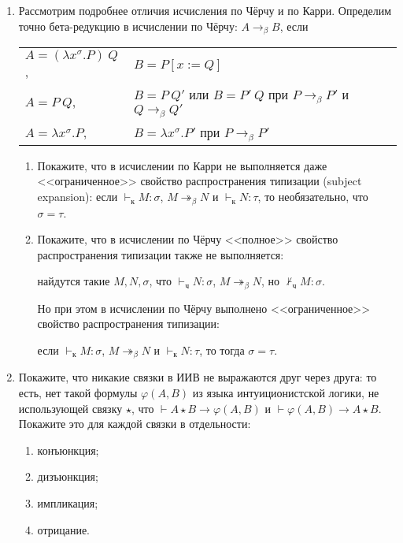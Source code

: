 \documentclass[10pt,a4paper,oneside]{article}
\begin{document}
\begin{enumerate}
\item Рассмотрим подробнее отличия исчисления по Чёрчу и по Карри. 
Определим точно бета-редукцию в исчислении по Чёрчу: $A \rightarrow_\beta B$, если

\begin{tabular}{ll}
$A = (\lambda x^\sigma.P)\ Q$, & $B = P [x := Q]$\\
$A = P\ Q$, & $B = P\ Q'$ или $B = P'\ Q$ при $P \rightarrow_\beta P'$ и $Q \rightarrow_\beta Q'$\\
$A = \lambda x^\sigma.P$, & $B = \lambda x^\sigma.P'$ при $P \rightarrow_\beta P'$
\end{tabular}
\begin{enumerate}
\item Покажите, что в исчислении по Карри не выполняется даже <<ограниченное>> свойство распространения типизации
(subject expansion): 
если $\vdash_\text{к} M:\sigma$, $M \twoheadrightarrow_\beta N$ и $\vdash_\text{к} N:\tau$,
то необязательно, что $\sigma=\tau$.
\item Покажите, что в исчислении по Чёрчу <<полное>> свойство распространения типизации также не выполняется:

\begin{center}найдутся такие $M,N,\sigma$, что $\vdash_\text{ч} N:\sigma$, $M\twoheadrightarrow_\beta N$, но $\not\vdash_\text{ч} M:\sigma$.\end{center}

Но при этом в исчислении по Чёрчу выполнено <<ограниченное>> свойство распространения типизации:

\begin{center}если $\vdash_\text{к} M:\sigma$, $M \twoheadrightarrow_\beta N$ и $\vdash_\text{к} N:\tau$,
то тогда $\sigma=\tau$.\end{center}
\end{enumerate}

\item Покажите, что никакие связки в ИИВ не выражаются друг через друга: то есть, нет такой формулы $\varphi(A,B)$ из языка 
интуиционистской логики, не использующей связку $\star$, что $\vdash A \star B \rightarrow \varphi(A,B)$ и $\vdash\varphi(A,B) \rightarrow A \star B$.
Покажите это для каждой связки в отдельности:
\begin{enumerate}
\item конъюнкция;
\item дизъюнкция;
\item импликация;
\item отрицание.
\end{enumerate}


\end{enumerate}
\end{document}
